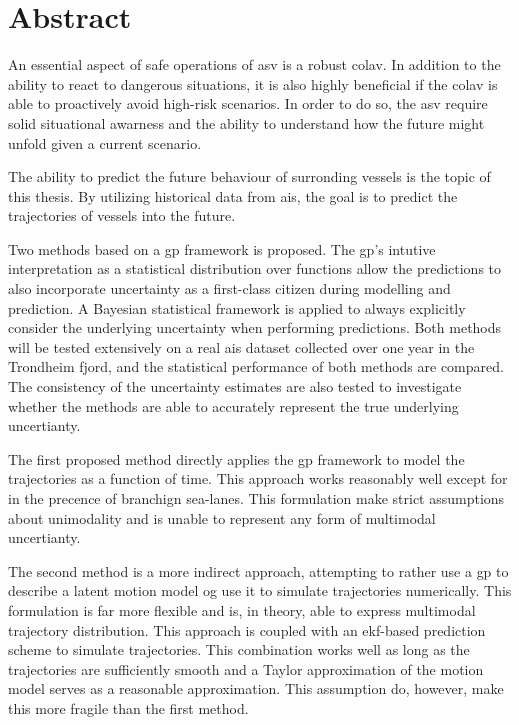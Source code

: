 \chapter*{Abstract}
An essential aspect of safe operations of \acrshort{asv} is a robust \acrfull{colav}. In addition to the ability to react to dangerous situations, it is also highly beneficial if the \acrshort{colav} is able to proactively avoid high-risk scenarios. In order to do so, the \acrshort{asv} require solid situational awarness and the ability to understand how the future might unfold given a current scenario. 

The ability to predict the future behaviour of surronding vessels is the topic of this thesis. By utilizing historical data from \acrfull{ais}, the goal is to predict the trajectories of vessels into the future. 

Two methods based on a \acrfull{gp} framework is proposed. The \acrshort{gp}'s intutive interpretation as a statistical distribution over functions allow the predictions to also incorporate uncertainty as a first-class citizen during modelling and prediction. A Bayesian statistical framework is applied to always explicitly consider the underlying uncertainty when performing predictions. 
Both methods will be tested extensively on a real \acrshort{ais} dataset collected over one year in the Trondheim fjord, and the statistical performance of both methods are compared. The consistency of the uncertainty estimates are also tested to investigate whether the methods are able to accurately represent the true underlying uncertianty.

The first proposed method directly applies the \acrshort{gp} framework to model the trajectories as a function of time. This approach works reasonably well except for in the precence of branchign sea-lanes. This formulation make strict assumptions about unimodality and is unable to represent any form of multimodal uncertianty.

The second method is a more indirect approach, attempting to rather use a \acrshort{gp} to describe a latent motion model og use it to simulate trajectories numerically. This formulation is far more flexible and is, in theory, able to express multimodal trajectory distribution. This approach is coupled with an \acrfull{ekf}-based prediction scheme to simulate trajectories. This combination works well as long as the trajectories are sufficiently smooth and a Taylor approximation of the motion model serves as a reasonable approximation. This assumption do, however, make this more fragile than the first method.  